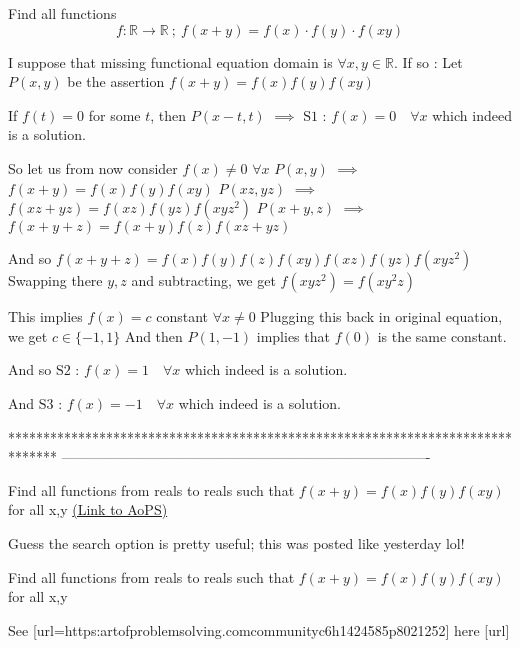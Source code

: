 \begin{solution}
	\begin{tcolorbox}Find all functions 
\[f:\mathbb{R}\rightarrow \mathbb{R} \ ; \ f(x+y)=f(x)\cdot f(y)\cdot f(xy)\]\end{tcolorbox}
I suppose that missing functional equation domain is $\forall x,y\in\mathbb R$. If so :
Let $P(x,y)$ be the assertion $f(x+y)=f(x)f(y)f(xy)$

If $f(t)=0$ for some $t$, then $P(x-t,t)$ $\implies$ 
$\boxed{\text{S1 : }f(x)=0\quad\forall x}$ which indeed is a solution.

So let us from now consider $f(x)\ne 0$ $\forall x$
$P(x,y)$ $\implies$ $f(x+y)=f(x)f(y)f(xy)$
$P(xz,yz)$ $\implies$ $f(xz+yz)=f(xz)f(yz)f(xyz^2)$
$P(x+y,z)$ $\implies$ $f(x+y+z)=f(x+y)f(z)f(xz+yz)$

And so $f(x+y+z)=f(x)f(y)f(z)f(xy)f(xz)f(yz)f(xyz^2)$
Swapping there $y,z$ and subtracting, we get $f(xyz^2)=f(xy^2z)$

This implies $f(x)=c$ constant $\forall x\ne 0$
Plugging this back in original equation, we get $c\in\{-1,1\}$
And then $P(1,-1)$ implies that $f(0)$ is the same constant.

And so $\boxed{\text{S2 : }f(x)=1\quad\forall x}$ which indeed is a solution.

And $\boxed{\text{S3 : }f(x)=-1\quad\forall x}$ which indeed is a solution.
\end{solution}
*******************************************************************************
-------------------------------------------------------------------------------

\begin{problem}
	Find all functions from reals to reals such that $f(x+y)=f(x)f(y)f(xy)$ for all x,y
	\flushright \href{https://artofproblemsolving.com/community/c6h1627924}{(Link to AoPS)}
\end{problem}



\begin{solution}
	Guess the search option is pretty useful; this was posted like yesterday lol!
\end{solution}



\begin{solution}
	\begin{tcolorbox}Find all functions from reals to reals such that $f(x+y)=f(x)f(y)f(xy)$ for all x,y\end{tcolorbox}

See [url=https:\/\/artofproblemsolving.com\/community\/c6h1424585p8021252] here [\/url]
\end{solution}



